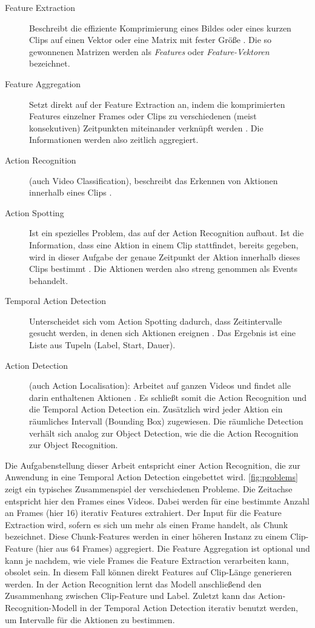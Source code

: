 \begin{description}
    \item[Feature Extraction]
    Beschreibt die effiziente Komprimierung eines Bildes oder eines kurzen Clips auf einen Vektor oder eine Matrix mit fester Größe \cite{Tran14}.
    Die so gewonnenen Matrizen werden als \emph{Features} oder \emph{Feature-Vektoren} bezeichnet.
    \item[Feature Aggregation]
    Setzt direkt auf der Feature Extraction an, indem die komprimierten Features einzelner Frames oder Clips zu verschiedenen (meist konsekutiven) Zeitpunkten miteinander verknüpft werden \cite{Ng15}.
    Die Informationen werden also zeitlich aggregiert.
    \item[Action Recognition]
    (auch Video Classification), beschreibt das Erkennen von Aktionen innerhalb eines Clips \cite{Rodriguez08}.
    \item[Action Spotting]
    Ist ein spezielles Problem, das auf der Action Recognition aufbaut.
    Ist die Information, dass eine Aktion in einem Clip stattfindet, bereits gegeben, wird in dieser Aufgabe der genaue Zeitpunkt der Aktion innerhalb dieses Clips bestimmt \cite{Giancola18}.
    Die Aktionen werden also streng genommen als Events behandelt.
    \item[Temporal Action Detection]
    Unterscheidet sich vom Action Spotting dadurch, dass Zeitintervalle gesucht werden, in denen sich Aktionen ereignen \cite{Xia20}.
    Das Ergebnis ist eine Liste aus Tupeln (Label, Start, Dauer).
    \item[Action Detection]
    (auch Action Localisation): Arbeitet auf ganzen Videos und findet alle darin enthaltenen Aktionen \cite{Xia20}.
    Es schließt somit die Action Recognition und die Temporal Action Detection ein.
    Zusätzlich wird jeder Aktion ein räumliches Intervall (Bounding Box) zugewiesen.
    Die räumliche Detection verhält sich analog zur Object Detection, wie die die Action Recognition zur Object Recognition.
\end{description}


Die Aufgabenstellung dieser Arbeit entspricht einer Action Recognition, die zur Anwendung in eine Temporal Action Detection eingebettet wird.
\autoref{fig:problems} zeigt ein typisches Zusammenspiel der verschiedenen Probleme.
Die Zeitachse entspricht hier den Frames eines Videos.
Dabei werden für eine bestimmte Anzahl an Frames (hier 16) iterativ Features extrahiert.
Der Input für die Feature Extraction wird, sofern es sich um mehr als einen Frame handelt, als Chunk bezeichnet.
Diese Chunk-Features werden in einer höheren Instanz zu einem Clip-Feature (hier aus 64 Frames) aggregiert.
Die Feature Aggregation ist optional und kann je nachdem, wie viele Frames die Feature Extraction verarbeiten kann, obsolet sein.
In diesem Fall können direkt Features auf Clip-Länge generieren werden.
In der Action Recognition lernt das Modell anschließend den Zusammenhang zwischen Clip-Feature und Label.
Zuletzt kann das Action-Recognition-Modell in der Temporal Action Detection iterativ benutzt werden, um Intervalle für die Aktionen zu bestimmen.

